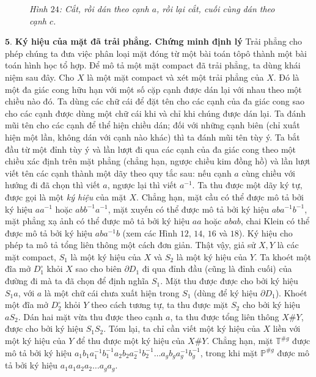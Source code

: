 \begin{multicols}{2}
\begin{figure}[H]
		\caption{\small\textit{\color{duongvaotoanhoc}Hình $24$: Cắt, rồi dán theo cạnh $a$, rồi lại cắt, cuối cùng dán theo cạnh $c$.}}
		\vspace*{-10pt}
	\end{figure}
	$\pmb{5.}$ \textbf{\color{duongvaotoanhoc}Ký hiệu của mặt đã trải phẳng. Chứng minh định lý}
	\vskip 0.1cm
	Trải phẳng cho phép chúng ta đưa việc phân loại mặt đóng từ một bài toán tôpô thành một bài toán hình học tổ hợp. Để mô tả một mặt compact đã trải phẳng, ta dùng khái niệm sau đây. Cho $X$ là một mặt compact và xét một trải phẳng của $X$. Đó là một đa giác cong hữu hạn với một số cặp cạnh được dán lại với nhau theo một chiều nào đó. Ta dùng các chữ cái để đặt tên cho các cạnh của đa giác cong sao cho các cạnh được dùng một chữ cái khi và chỉ khi chúng được dán lại. Ta đánh mũi tên cho các cạnh để thể hiện chiều dán; đối với những cạnh biên (chỉ xuất hiện một lần, không dán với cạnh nào khác) thì ta đánh mũi tên tùy ý. Ta bắt đầu từ một đỉnh tùy ý và lần lượt đi qua các cạnh của đa giác cong theo một chiều xác định trên mặt phẳng (chẳng hạn, ngược chiều kim đồng hồ) và lần lượt viết tên các cạnh thành một dãy theo quy tắc sau: nếu cạnh $a$ cùng chiều với hướng đi đã chọn thì viết $a$, ngược lại thì viết $a^{-1}$. Ta thu được một dãy ký tự, được gọi là một {\it ký hiệu} của mặt $X$.
	\vskip 0.1cm
	Chẳng hạn, mặt cầu có thể được mô tả bởi ký hiệu $aa^{-1}$ hoặc $abb^{-1}a^{-1}$, mặt xuyến có thể được mô tả bởi ký hiệu $aba^{-1}b^{-1}$, mặt phẳng xạ ảnh có thể được mô tả bởi ký hiệu $aa$ hoặc $abab$, chai Klein có thể được mô tả bởi ký hiệu $aba^{-1}b$ (xem các Hình $12$, $14$, $16$ và $18$).
	\vskip 0.1cm
	Ký hiệu cho phép ta mô tả tổng liên thông một cách đơn giản. Thật vậy, giả sử $X, Y$ là các mặt compact, $S_1$ là một ký hiệu của $X$ và $S_2$ là một ký hiệu của $Y$. Ta khoét một đĩa mở $D_1^\circ$ khỏi $X$ sao cho biên $\partial D_1$ đi qua đỉnh đầu (cũng là đỉnh cuối) của đường đi mà ta đã chọn để định nghĩa $S_1$. Mặt thu được được cho bởi ký hiệu $S_1a$, với $a$ là một chữ cái chưa xuất hiện trong $S_1$ (dùng để ký hiệu $\partial D_1$). Khoét một đĩa mở $D_2^\circ$ khỏi $Y$ theo cách tương tự, ta thu được mặt $S_2$ cho bởi ký hiệu $aS_2$. Dán hai mặt vừa thu được theo cạnh $a$, ta thu được tổng liên thông $X \# Y$, được cho bởi ký hiệu $S_1S_2$. Tóm lại, ta chỉ cần viết một ký hiệu của $X$ liền với một ký hiệu của $Y$ để thu được một ký hiệu của $X \# Y$. Chẳng hạn, mặt $\mathbb{T}^{\# g}$ được mô tả bởi ký hiệu $a_1b_1a_1^{-1}b_1^{-1}a_2b_2a_2^{-1}b_2^{-1}\ldots a_gb_ga_g^{-1} b_g^{-1}$, trong khi mặt $\mathbb{P}^{\# g}$ được mô tả bởi ký hiệu $a_1a_1a_2a_2\ldots a_ga_g$.

\end{multicols}
